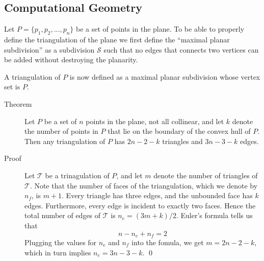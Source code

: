 \subsection{Computational Geometry}
Let $P = \{p_1, p_2, ..., p_n\}$ be a set of points in the plane. To be able to properly define the
triangulation of the plane we first define the ``maximal planar subdivision'' as a subdivision $\mathcal{S}$
such that no edges that connects two vertices can be added without destroying the planarity.

A triangulation of $P$ is now defined as a maximal planar subdivision whose vertex set is $P$.

\begin{description}
\item[Theorem] Let $P$ be a set of $n$ points in the plane, not all collinear, and let $k$ denote the number of points in $P$ that lie on the boundary of the convex hull
  of $P$. Then any triangulation of $P$ has $2n−2−k$ triangles and $3n−3−k$ edges.

\item[Proof] Let $\mathcal{T}$ be a trinagulation of $P$, and let $m$ denote the number of triangles of $\mathcal{T}$.
  Note that the number of faces of the triangulation, which we denote by $n_f$, is $m+1$. Every triangle has three edges, and the unbounded face has $k$ edges.
  Furthermore, every edge is incident to exactly two faces. Hence the total number of edges of $\mathcal{T}$ is $n_e = (3m+k)/2$. Euler's formula tells us that
  \[
    n-n_e+n_f = 2
  \]
  Plugging the values for $n_e$ and $n_f$ into the fomula, we get $m=2n-2-k$, which in turn implies $n_e = 3n-3-k$. \qed
\end{description}

